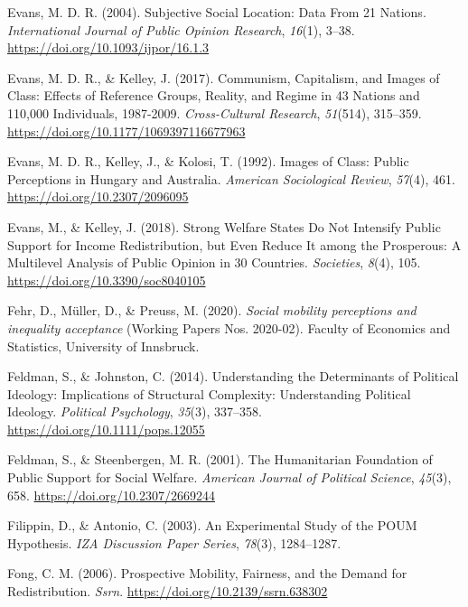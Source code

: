 \documentclass[
  12pt,
]{book}
\newlength{\cslhangindent}
\newenvironment{cslreferences}%
  {\setlength{\parindent}{0pt}%
  \everypar{\setlength{\hangindent}{\cslhangindent}}\ignorespaces}%
  {\par}
\begin{document}
\begin{cslreferences}
\leavevmode\hypertarget{ref-Evans2004}{}%
Evans, M. D. R. (2004). Subjective Social Location: Data From 21 Nations. \emph{International Journal of Public Opinion Research}, \emph{16}(1), 3--38. \url{https://doi.org/10.1093/ijpor/16.1.3}

\leavevmode\hypertarget{ref-Evans2017}{}%
Evans, M. D. R., \& Kelley, J. (2017). Communism, Capitalism, and Images of Class: Effects of Reference Groups, Reality, and Regime in 43 Nations and 110,000 Individuals, 1987-2009. \emph{Cross-Cultural Research}, \emph{51}(514), 315--359. \url{https://doi.org/10.1177/1069397116677963}

\leavevmode\hypertarget{ref-Evans1992}{}%
Evans, M. D. R., Kelley, J., \& Kolosi, T. (1992). Images of Class: Public Perceptions in Hungary and Australia. \emph{American Sociological Review}, \emph{57}(4), 461. \url{https://doi.org/10.2307/2096095}

\leavevmode\hypertarget{ref-evans_strong_2018}{}%
Evans, M., \& Kelley, J. (2018). Strong Welfare States Do Not Intensify Public Support for Income Redistribution, but Even Reduce It among the Prosperous: A Multilevel Analysis of Public Opinion in 30 Countries. \emph{Societies}, \emph{8}(4), 105. \url{https://doi.org/10.3390/soc8040105}

\leavevmode\hypertarget{ref-fehr_social_2020}{}%
Fehr, D., Müller, D., \& Preuss, M. (2020). \emph{Social mobility perceptions and inequality acceptance} (Working Papers Nos. 2020-02). Faculty of Economics and Statistics, University of Innsbruck.

\leavevmode\hypertarget{ref-feldman_understanding_2014}{}%
Feldman, S., \& Johnston, C. (2014). Understanding the Determinants of Political Ideology: Implications of Structural Complexity: Understanding Political Ideology. \emph{Political Psychology}, \emph{35}(3), 337--358. \url{https://doi.org/10.1111/pops.12055}

\leavevmode\hypertarget{ref-feldman_humanitarian_2001}{}%
Feldman, S., \& Steenbergen, M. R. (2001). The Humanitarian Foundation of Public Support for Social Welfare. \emph{American Journal of Political Science}, \emph{45}(3), 658. \url{https://doi.org/10.2307/2669244}

\leavevmode\hypertarget{ref-Filippin2003}{}%
Filippin, D., \& Antonio, C. (2003). An Experimental Study of the POUM Hypothesis. \emph{IZA Discussion Paper Series}, \emph{78}(3), 1284--1287.

\leavevmode\hypertarget{ref-fong_prospective_2006}{}%
Fong, C. M. (2006). Prospective Mobility, Fairness, and the Demand for Redistribution. \emph{Ssrn}. \url{https://doi.org/10.2139/ssrn.638302}


\end{cslreferences}
\end{document}
